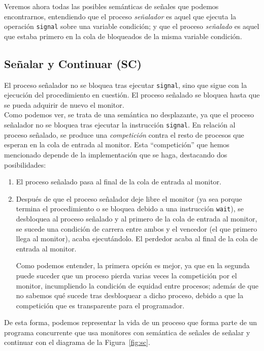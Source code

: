 Veremos ahora todas las posibles semánticas de señales que podemos encontrarnos, entendiendo que el proceso \textit{señalador} es aquel que ejecuta la operación \verb|signal| sobre una variable condición; y que el proceso \textit{señalado} es aquel que estaba primero en la cola de bloqueados de la misma variable condición.

\subsection{Señalar y Continuar (SC)}
El proceso señalador no se bloquea tras ejecutar \verb|signal|, sino que sigue con la ejecución del procedimiento en cuestión. El proceso señalado se bloquea hasta que se pueda adquirir de nuevo el monitor.\\

Como podemos ver, se trata de una semántica no desplazante, ya que el proceso señalador no se bloquea tras ejecutar la instrucción \verb|signal|. En relación al proceso señalado, se produce una \textit{competición} contra el resto de procesos que esperan en la cola de entrada al monitor. Esta ``competición'' que hemos mencionado depende de la implementación que se haga, destacando dos posibilidades:
\begin{enumerate}
    \item El proceso señalado pasa al final de la cola de entrada al monitor.
    \item Después de que el proceso señalador deje libre el monitor (ya sea porque termina el procedimiento o se bloquea debido a una instrucción \verb|wait|), se desbloquea al proceso señalado y al primero de la cola de entrada al monitor, se sucede una condición de carrera entre ambos y el vencedor (el que primero llega al monitor), acaba ejecutándolo. El perdedor acaba al final de la cola de entrada al monitor.

        Como podemos entender, la primera opción es mejor, ya que en la segunda puede suceder que un proceso pierda varias veces la competición por el monitor, incumpliendo la condición de equidad entre procesos; además de que no sabemos qué sucede tras desbloquear a dicho proceso, debido a que la competición que es transparente para el programador.
\end{enumerate}
De esta forma, podemos representar la vida de un proceso que forma parte de un programa concurrente que usa monitores con semántica de señales de señalar y continuar con el diagrama de la Figura~\ref{fig:sc}.

